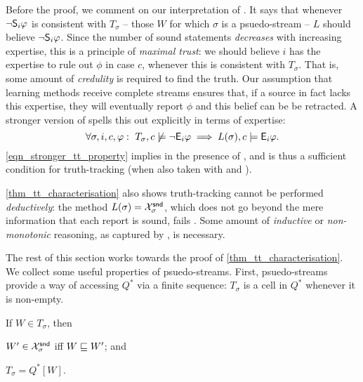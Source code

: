 Before the proof, we comment on our interpretation of
\credulity{}. It says that whenever $\neg\S_i\phi$
is consistent with $T_\sigma$ -- those $W$ for which $\sigma$ is a
psuedo-stream -- $L$ should believe $\neg\S_i\phi$. Since the number of
sound statements \emph{decreases} with increasing expertise, this is a
principle of \emph{maximal trust}: we should believe $i$ has the expertise to
rule out $\phi$ in case $c$, whenever this is consistent with $T_\sigma$.  That
is, some amount of \emph{credulity} is required to find the truth. Our
assumption that learning methods receive complete streams ensures that, if a
source in fact lacks this expertise, they will eventually report $\phi$ and
this belief can be be retracted.
%
A stronger version of \credulity{} spells this out
explicitly in terms of expertise:
\begin{equation}
    \label{eqn_stronger_tt_property}
    \forall \sigma, i, c, \phi:\
    T_\sigma, c \not\models \neg\E_i\phi
    \implies
    L(\sigma), c \models \E_i\phi.
\end{equation}
\cref{eqn_stronger_tt_property} implies \credulity{}
in the presence of \soundness{}, and is thus a sufficient condition for
truth-tracking (when also taken with \equivalence{} and
\repetition{}).\footnotemark{}


\cref{thm_tt_characterisation} also shows truth-tracking cannot be performed
\emph{deductively}: the method $L(\sigma) = \Xsnd_\sigma$, which does not go
beyond the mere information that each report is sound, fails \credulity{}. Some
amount of \emph{inductive} or \emph{non-monotonic} reasoning, as captured by
\credulity{}, is necessary.

The rest of this section works towards the proof of
\cref{thm_tt_characterisation}. We collect some useful properties of
psuedo-streams. First, psuedo-streams provide a way of accessing $Q^*$ via a
finite sequence: $T_\sigma$ is a cell in $Q^*$ whenever it is non-empty.

\begin{lemma}
    \label{lemma_tsigma_qstar}
    If $W \in T_\sigma$, then
    \begin{inlinelist}
        \item\label{item_ps_upperset} $W' \in \Xsnd_\sigma$ iff $W \specleq
            W'$; and
        \item\label{item_tsigma_qstar} $T_\sigma = Q^*[W]$.
    \end{inlinelist}
\end{lemma}


